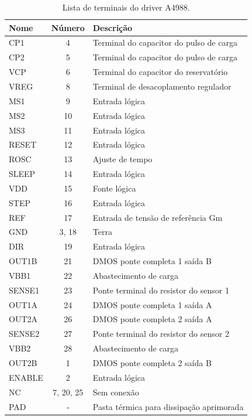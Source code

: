 \begin{table}[H]
    \footnotesize
    \centering
    \caption{Lista de terminais do driver A4988.}
    \begin{tabular}{lcl}
        \hline
        \textbf{Nome} & \textbf{Número} & \textbf{Descrição}\\
        \hline
         CP1 & 4 & Terminal do capacitor do pulso de carga\\
         CP2 & 5 & Terminal do capacitor do pulso de carga\\
         VCP & 6 & Terminal do capacitor do reservatório\\
         VREG & 8 & Terminal de desacoplamento regulador\\
         MS1 & 9 & Entrada lógica\\
         MS2 & 10 & Entrada lógica\\
         MS3 & 11 & Entrada lógica\\
         RESET & 12 & Entrada lógica\\
         ROSC & 13 & Ajuste de tempo\\
         SLEEP & 14 & Entrada lógica\\
         VDD & 15 & Fonte lógica\\
         STEP & 16 & Entrada lógica\\
         REF & 17 & Entrada de tensão de referência Gm\\
         GND & 3, 18 & Terra\\
         DIR & 19 & Entrada lógica\\
         OUT1B & 21 & DMOS ponte completa 1 saída B\\
         VBB1 & 22 & Abastecimento de carga\\
         SENSE1 & 23 & Ponte terminal do resistor do sensor 1\\
         OUT1A & 24 & DMOS ponte completa 1 saída A\\
         OUT2A & 26 & DMOS ponte completa 2 saída A\\
         SENSE2 & 27 & Ponte terminal do resistor do sensor 2\\
         VBB2 & 28 & Abastecimento de carga\\
         OUT2B & 1 & DMOS ponte completa 2 saída B\\
         ENABLE & 2 & Entrada lógica\\
         NC & 7, 20, 25 & Sem conexão\\
         PAD & - & Pasta térmica para dissipação aprimorada\\
        \hline       
    \end{tabular}
    \label{tab:pdriverportas}
\end{table}

